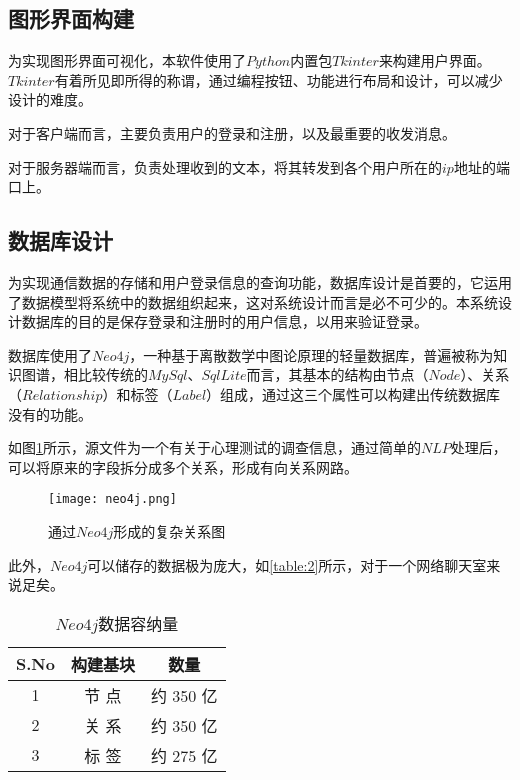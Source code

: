 \documentclass[forprint]{OSPaper}
\begin{document}
\subsection{图形界面构建}

为实现图形界面可视化，本软件使用了$Python$内置包$Tkinter$来构建用户界面。$Tkinter$有着所见即所得的称谓，通过编程按钮、功能进行布局和设计，可以减少设计的难度。

对于客户端而言，主要负责用户的登录和注册，以及最重要的收发消息。

对于服务器端而言，负责处理收到的文本，将其转发到各个用户所在的$ip$地址的端口上。

\subsection{数据库设计}

为实现通信数据的存储和用户登录信息的查询功能，数据库设计是首要的，它运用了数据模型将系统中的数据组织起来，这对系统设计而言是必不可少的。本系统设计数据库的目的是保存登录和注册时的用户信息，以用来验证登录。

数据库使用了$ Neo4j $，一种基于离散数学中图论原理的轻量数据库，普遍被称为知识图谱，相比较传统的$MySql$、$SqlLite$而言，其基本的结构由节点（$Node$）、关系（$Relationship$）和标签（$Label$）组成，通过这三个属性可以构建出传统数据库没有的功能。

如图\ref{fig:10}所示，源文件为一个有关于心理测试的调查信息，通过简单的$NLP$处理后，可以将原来的字段拆分成多个关系，形成有向关系网路。

\begin{figure}[ht]
	\centering
	\texttt{[image: neo4j.png]}
	\caption{通过$ Neo4j $形成的复杂关系图}
	\label{fig:10}
\end{figure}

此外，$Neo4j$可以储存的数据极为庞大，如\ref{table:2}所示，对于一个网络聊天室来说足矣。

\begin{table}[ht]\centering
	\caption{$Neo4j$数据容纳量}
	\label{table:3}
	\begin{tabular}{ccc}
		\hline
		S.No & 构建基块 & 数量      \\ \hline
		1    & 节  点 & 约 350 亿 \\
		2    & 关  系 & 约 350 亿 \\
		3    & 标  签 & 约 275 亿 \\ \hline
		
	\end{tabular}
\end{table}
\clearpage
\end{document}
